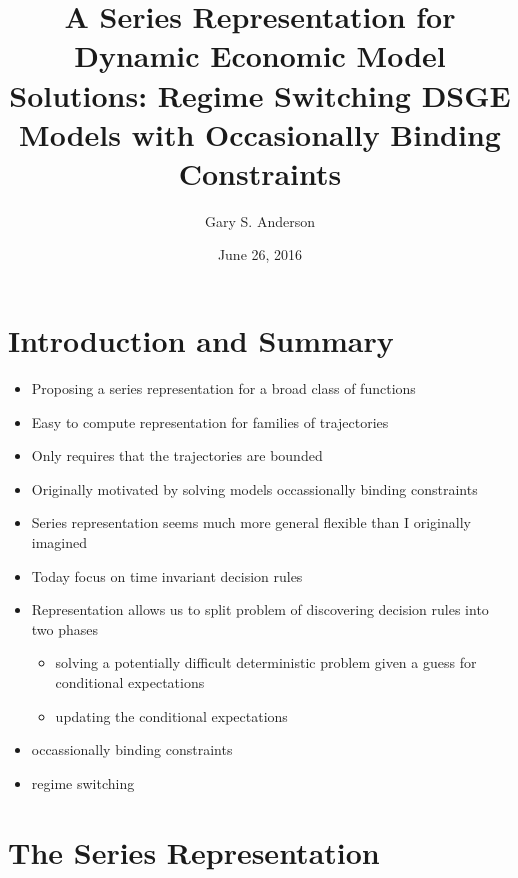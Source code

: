 \documentclass[tikz]{beamer}
\begin{document}
\title[A Series Representation  for Solving  Models]{A Series Representation for Dynamic Economic Model Solutions: Regime Switching DSGE Models with Occasionally Binding Constraints }


\author{Gary S. Anderson}
\date{June 26, 2016} 


\frame{\titlepage}

\section{Introduction and Summary}

\begin{frame}

 \begin{itemize}
 \item Proposing a series representation for a broad class of functions
 \item Easy to compute representation for 
families of trajectories
\item Only requires that the trajectories are bounded
\item Originally motivated by solving models occassionally binding constraints
\item Series representation seems much more general flexible than I originally imagined
\end{itemize}
\end{frame}


\begin{frame}
     \begin{itemize}
   \item Today focus on time invariant decision rules 
   \item Representation allows us to split problem of discovering decision rules into two phases
     \begin{itemize}
     \item solving a potentially difficult deterministic problem given a guess for conditional expectations
     \item updating the conditional expectations
   \end{itemize}
     \item occassionally binding constraints
     \item regime switching
\end{itemize}

\end{frame}
\section{The Series Representation}
\end{document}
